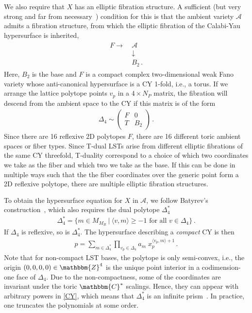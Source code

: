 \documentclass[11pt]{article}
\numberwithin{equation}{section}
\begin{document}
We also require that $X$ has an elliptic fibration structure. A sufficient (but very strong and far from necessary~\cite{Anderson:2017aux, Grimm:2019bey}) condition for this is that the ambient variety $\mathcal{A}$ admits a fibration structure, from which the elliptic fibration of the Calabi-Yau hypersurface is inherited,
\begin{align}
\begin{split}
    F \rightarrow &~\mathcal{A}\\ 
    &~\downarrow\\
    &~B_{2}\,.
\end{split}
\end{align}
Here, $B_{2}$ is the base and $F$ is a compact complex two-dimensional weak Fano variety whose anti-canonical hypersurface is a CY 1-fold, i.e., a torus. If we arrange the lattice polytope points $v_p$ in a $4\times N_P$ matrix, the fibration will descend from the ambient space to the CY if this matrix is of the form
\begin{align}
\Delta_{4}\sim
\begin{pmatrix}
  F & 0\\ 
  T & B_{2}
\end{pmatrix}\,.
\end{align}
Since there are 16 reflexive 2D polytopes $F$, there are 16 different toric ambient spaces or fiber types. Since T-dual LSTs arise from different elliptic fibrations of the same CY threefold, T-duality correspond to a choice of which two coordinates we take as the fiber and which two we take as the base. If this can be done in multiple ways such that the the fiber coordinates over the generic point form a 2D reflexive polytope, there are multiple elliptic fibration structures.

To obtain the hypersurface equation for $X$ in $\mathcal{A}$, we follow Batyrev's construction~\cite{Batyrev:1994pg}, which also requires the dual polytope $\Delta^{*}_{4}$
\begin{align}
\Delta^{*}_{4}=\{m \in M_{M_{R}}~|~\langle v, m \rangle \geq -1 \text{ for all } v\in \Delta_{4}\}\,.
\end{align}
If $\Delta_{4}$ is reflexive, so is $\Delta^{*}_{4}$. The hypersurface describing a \textit{compact} CY is then
\begin{align}
\label{CY}
p=\sum_{m \in \Delta^{*}_{4}}\prod_{v_{p} \in \Delta_{4}} a_{m}\; x_{p}^{\langle v_{p}, m \rangle +1}\,.
\end{align}
Note that for non-compact LST bases, the polytope is only semi-convex, i.e.,  the origin $(0,0,0,0)\in\mathbbm{Z}^4$ is the unique point interior in a codimension-one face of $\Delta_4$. Due to the non-compactness, some of the coordinates are invariant under the toric $\mathbbm{C}^{*}$ scalings. Hence, they can appear with arbitrary powers in \eqref{CY}, which means that $\Delta^{*}_{4}$ is an infinite prism~\cite{Bouchard:2003bu,DelZotto:2022xrh}. In practice, one truncates the polynomials at some order. 
\end{document}
